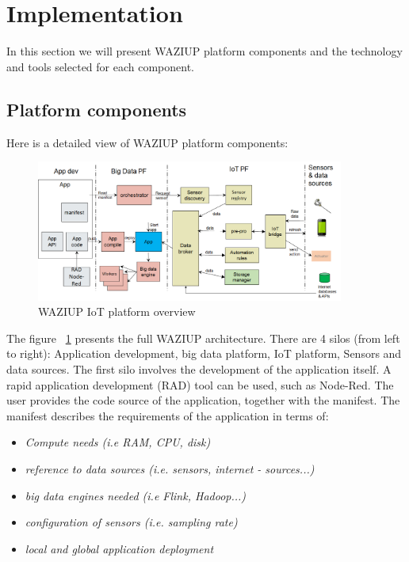 
\section{Implementation}
In this section we will present WAZIUP platform components and the technology and tools selected for each component.

\subsection{Platform components}
Here is a detailed view of WAZIUP platform components:

\begin{figure}[h!]
\centering
\includegraphics[width=0.9\textwidth]{figs/platformOverview.png}
\caption{WAZIUP IoT platform overview}
\label{fig:platformOverview}
\end{figure}

The figure ~\ref{fig:platformOverview} presents the full WAZIUP architecture. 
There are 4 silos (from left to right): Application development, big data platform, IoT platform, Sensors and data sources. 
The first silo involves the development of the application itself. 
A rapid application development (RAD) tool can be used, such as Node-Red. 
The user provides the code source of the application, together with the manifest. 
The manifest describes the requirements of the application in terms of:
\begin{itemize}
	\item \emph{Compute needs (i.e RAM, CPU, disk)}
	\item \emph{reference to data sources (i.e. sensors, internet - sources...)}
	\item \emph{big data engines needed (i.e Flink, Hadoop...)}
	\item \emph{configuration of sensors (i.e. sampling rate)}
	\item \emph{local and global application deployment}
\end{itemize}

